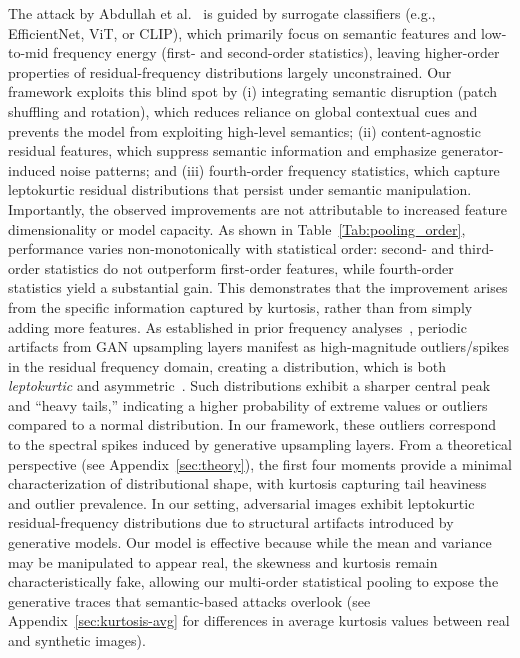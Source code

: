 \documentclass[letterpaper,twocolumn,10pt]{article}
\begin{document}
The attack by Abdullah et al.~\cite{Sifat2024evolvingthreat} is guided by surrogate classifiers (e.g., EfficientNet, ViT, or CLIP), which primarily focus on semantic features and low-to-mid frequency energy (first- and second-order statistics), leaving higher-order properties of residual-frequency distributions largely unconstrained. Our framework exploits this blind spot by (i) integrating semantic disruption (patch shuffling and rotation), which reduces reliance on global contextual cues and prevents the model from exploiting high-level semantics; (ii) content-agnostic residual features, which suppress semantic information and emphasize generator-induced noise patterns; and (iii) fourth-order frequency statistics, which capture leptokurtic residual distributions that persist under semantic manipulation. Importantly, the observed improvements are not attributable to increased feature dimensionality or model capacity. As shown in Table~\ref{Tab:pooling_order}, performance varies non-monotonically with statistical order: second- and third-order statistics do not outperform first-order features, while fourth-order statistics yield a substantial gain. This demonstrates that the improvement arises from the specific information captured by kurtosis, rather than from simply adding more features.
%
As established in prior frequency analyses~\cite{Wang2024cnngenerated, frank2020leveraging}, periodic artifacts from GAN upsampling layers manifest as high-magnitude outliers/spikes in the residual frequency domain, creating a distribution, which is both \emph{leptokurtic} and asymmetric~\cite{Hulzebosch2019detecting}.
%
Such distributions exhibit a sharper central peak and ``heavy tails,'' indicating a higher probability of extreme values or outliers compared to a normal distribution.
In our framework, these outliers correspond to the spectral spikes induced by generative upsampling layers.  
From a theoretical perspective (see Appendix~\ref{sec:theory}), the first four moments provide a minimal characterization of distributional shape, with kurtosis capturing tail heaviness and outlier prevalence. In our setting, adversarial images exhibit leptokurtic residual-frequency distributions due to structural artifacts introduced by generative models. Our model is effective because while the mean and variance may be manipulated to appear real, the skewness and kurtosis remain characteristically fake, allowing our multi-order statistical pooling to expose the generative traces that semantic-based attacks overlook (see Appendix~\ref{sec:kurtosis-avg} for differences in average kurtosis values between real and synthetic images).
\end{document}
